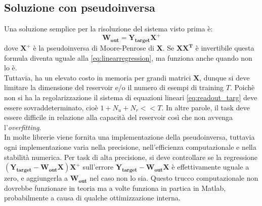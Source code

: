 \subsection{Soluzione con pseudoinversa}
Una soluzione semplice per la risoluzione del sistema visto prima è:
\begin{equation} \label{eq:pseudoinversa}
\mathbf{W_{out}}= \mathbf{Y_{target}X^+}
\end{equation}
dove $\mathbf{X^+}$ è la pseudoinversa di Moore-Penrose di $\mathbf{X}$. Se $\mathbf{XX^T}$ è invertibile questa formula diventa uguale alla \ref{eq:linearregression}, ma funziona anche quando non lo è.\\
Tuttavia, ha un elevato costo in memoria per grandi matrici $\mathbf{X}$, dunque si deve limitare la dimensione del reservoir e/o il numero di esempi di training $T$.
Poichè non si ha la regolarizzazione il sistema di equazioni lineari \ref{eq:readout_targ} deve essere sovraddeterminato, cioè $ 1+N_u+ N_r << T$. In altre parole, il task deve essere difficile in relazione alla capacità del reservoir così che non avvenga l'\textit{overfitting}.\\
In molte librerie viene fornita una implementazione della pseudoinversa, tuttavia ogni implementazione varia nella precisione, nell'efficienza computazionale e nella stabilità numerica. Per task di alta precisione, si deve controllare se la regressione $\mathbf{(Y_{target} -W_{out}X)X^+}$ sull'errore $\mathbf{Y_{target} -W_{out}X}$ è effettivamente uguale a zero, e aggiungerla a $\mathbf{W_{out}}$ nel caso non lo sia. Questo trucco computazionale non dovrebbe funzionare in teoria ma a volte funziona in partica in Matlab, probabilmente a causa di qualche ottimizzazione interna.

